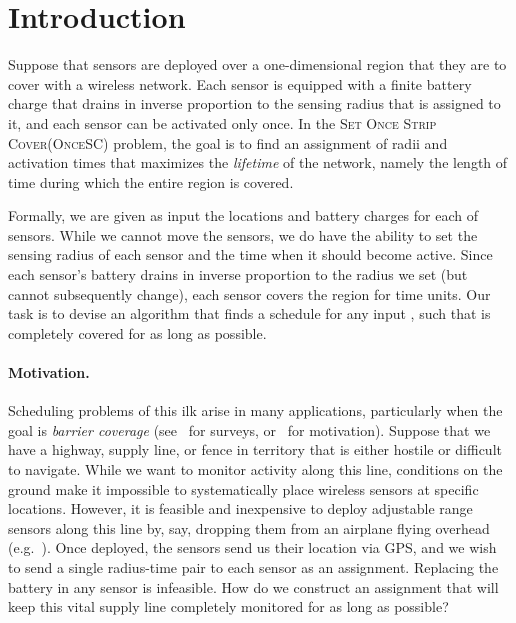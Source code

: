 \documentclass[11pt]{article}
\newcommand{\sosc}{\textsc{OnceSC}\xspace}
\newcommand{\sosclong}{\textsc{Set Once Strip Cover}\xspace}
\begin{document}
\section{Introduction}

Suppose that  sensors are deployed over a one-dimensional
region that they are to cover with a wireless network. Each sensor is
equipped with a finite battery charge that drains in inverse
proportion to the sensing radius that is assigned to it, and each
sensor can be activated only once.  In the \sosclong (\sosc) problem,
the goal is to find an assignment of radii and activation times that
maximizes the \emph{lifetime} of the network, namely the length of
time during which the entire region is covered.

Formally, we are given as input the locations  and
battery charges  for each of  sensors. While we
cannot move the sensors, we do have the ability to set the sensing
radius  of each sensor and the time  when it should
become active.  Since each sensor's battery drains in inverse
proportion to the radius we set (but cannot subsequently change), each
sensor covers the region  for
 time units.  Our task is to devise an algorithm that
finds a schedule 
for any input , such that  is completely covered for as
long as possible.




\paragraph*{\bf Motivation.}
Scheduling problems of this ilk arise in many applications,
particularly when the goal is \emph{barrier coverage}
(see~\cite{cardei2004coverage,wang2006survey} for surveys,
or~\cite{kumar2007barrier} for motivation).  Suppose that we have a
highway, supply line, or fence in territory that is either hostile or
difficult to navigate.  While we want to monitor activity along this
line, conditions on the ground make it impossible to systematically
place wireless sensors at specific locations.  However, it is feasible
and inexpensive to deploy adjustable range sensors along this line by,
say, dropping them from an airplane flying overhead
(e.g.~\cite{cardei2005improving,saipulla2009barrier,taniguchi2011uniform}).
Once deployed, the sensors send us their location via GPS, and we wish
to send a single radius-time pair to each sensor as an assignment.
Replacing the battery in any sensor is infeasible. How do we construct
an assignment that will keep this vital supply line completely
monitored for as long as possible?
\end{document}
